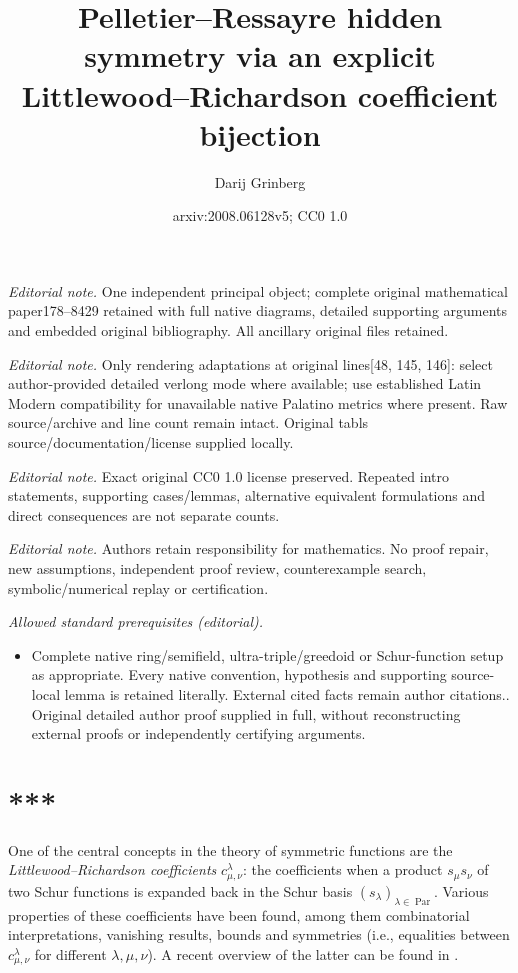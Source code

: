 \documentclass[numbers=enddot,12pt,final,onecolumn,notitlepage]{scrartcl}%
\title{Pelletier--Ressayre hidden symmetry via an explicit Littlewood--Richardson coefficient bijection}
\author{Darij Grinberg}
\date{arxiv:2008.06128v5; CC0 1.0}
\theoremstyle{definition}
\begin{document}
\maketitle
\noindent\textit{Editorial note.} One independent principal object; complete original mathematical paper178--8429 retained with full native diagrams, detailed supporting arguments and embedded original bibliography. All ancillary original files retained.\par\medskip
\noindent\textit{Editorial note.} Only rendering adaptations at original lines[48, 145, 146]: select author-provided detailed verlong mode where available; use established Latin Modern compatibility for unavailable native Palatino metrics where present. Raw source/archive and line count remain intact. Original tabls source/documentation/license supplied locally.\par\medskip
\noindent\textit{Editorial note.} Exact original CC0 1.0 license preserved. Repeated intro statements, supporting cases/lemmas, alternative equivalent formulations and direct consequences are not separate counts.\par\medskip
\noindent\textit{Editorial note.} Authors retain responsibility for mathematics. No proof repair, new assumptions, independent proof review, counterexample search, symbolic/numerical replay or certification.\par\medskip
\noindent\textit{Allowed standard prerequisites (editorial).}\begin{itemize}
\item Complete native ring/semifield, ultra-triple/greedoid or Schur-function setup as appropriate. Every native convention, hypothesis and supporting source-local lemma is retained literally. External cited facts remain author citations.. Original detailed author proof supplied in full, without reconstructing external proofs or independently certifying arguments.
\end{itemize}\medskip
\section*{***}

One of the central concepts in the theory of symmetric functions are the
\textit{Littlewood--Richardson coefficients} $c_{\mu,\nu}^{\lambda}$: the
coefficients when a product $s_{\mu}s_{\nu}$ of two Schur functions is
expanded back in the Schur basis $\left(  s_{\lambda}\right)  _{\lambda
\in\operatorname*{Par}}$. Various properties of these coefficients have been
found, among them combinatorial interpretations, vanishing results, bounds and
symmetries (i.e., equalities between $c_{\mu,\nu}^{\lambda}$ for different
$\lambda,\mu,\nu$). A recent overview of the latter can be found in
\cite{BriRos20}.
\end{document}
